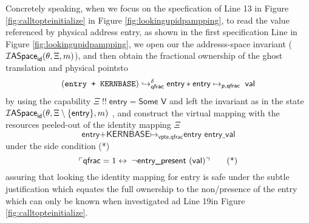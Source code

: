 Concretely speaking, when we focus on the specfication of Line 13 in Figure \ref{fig:calltopteinitialize} in Figure \ref{fig:lookingupidpampping}, to read the value referenced by physical address \textsf{entry}, as shown in the first specification Line in Figure \ref{fig:lookingupidpampping}, we open our the addresss-space invariant ($\mathcal{I}\textsf{ASpace}_{\textsf{id}}(\ptablestore,\Xi,m)$), and then obtain the fractional ownership of the ghost translation and physical pointsto
\[\fracghostmaptoken{\delta}{(\texttt{entry + KERNBASE})}{\textsf{entry}}{\textsf{qfrac}} \ast \mathsf{entry}\mapsto_{\mathsf{p,qfrac}}\; \vale \]
by using the capability $\Xi \;!!\; \textsf{entry} = \textsf{Some V}$ and left the invariant as in the state $\mathcal{I}\textsf{ASpace}_{\textsf{id}}(\ptablestore,\Xi\setminus\{\mathsf{entry}\},m)$ , and construct the virtual mapping with the resources peeled-out of the identity mapping $\Xi$ 
\[ \textsf{entry+KERNBASE} \mapsto_{\textsf{vpte,qfrac}} \textsf{entry entry\_val} \]
under the side condition (*)
\begin{equation*}
 \ulcorner \textsf{qfrac} = 1 \leftrightarrow \; \lnot\textsf{entry\_present }(\vale) \urcorner \tag{*}
\end{equation*}
assuring that looking the identity mapping for \textsf{entry} is safe under the subtle justification which equates the full ownership to the non/presence of the entry which can only be known when investigated ad Line 19in Figure \ref{fig:calltopteinitialize}.
